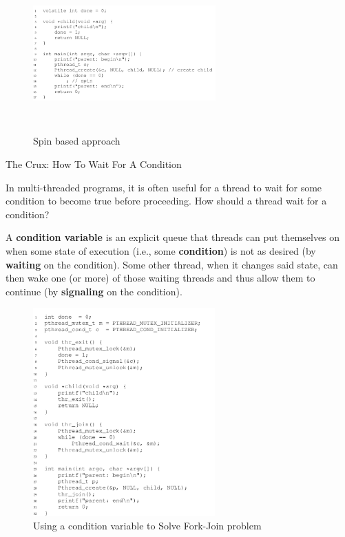 \begin{figure}[h!]
    \label{302}
    \begin{center}
        \includegraphics[width=7cm, height=6cm]{img/302.png}
        \caption{Spin based approach}
    \end{center}
\end{figure}

\begin{tcolorbox}
    \begin{center}
        The Crux: How To Wait For A Condition
    \end{center}

    In multi-threaded programs, it is often useful for a thread to wait for
    some condition to become true before proceeding. How should a thread wait for
    a condition?
\end{tcolorbox} 

A \textbf{condition variable} is an explicit queue that threads can put themselves on
when some state of execution (i.e., some \textbf{condition}) is not as desired
(by \textbf{waiting} on the condition). Some other thread, when it changes said
state, can then wake one (or more) of those waiting threads and thus allow them
to continue (by \textbf{signaling} on the condition).\\

\begin{figure}[h!]
    \begin{center}
        \includegraphics[width=7cm, height=8cm]{img/303.png}
        \caption{Using a condition variable to Solve Fork-Join problem}
    \end{center}
\end{figure} 

